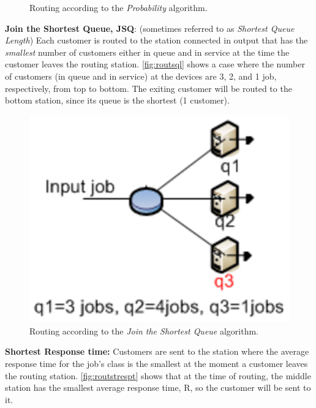 \begin{itemize*}
\begin{figure}[h!]
\begin{center}
    \end{center}
    \caption{Routing according to the \emph{Probability} algorithm.}
    \label{fig:routexe}
\end{figure}
\item \textbf{Join the Shortest Queue, JSQ}: (sometimes referred
to as \emph{Shortest Queue Length}) Each customer is routed to the
station connected in output that has the \emph{smallest} number of
customers either in queue and in service at the time the customer
leaves the routing station. \autoref{fig:routsql} shows a case
where the number of customers (in queue and in service) at the
devices are 3, 2, and 1 job, respectively, from top to bottom. The
exiting customer will be routed to the bottom station, since its
queue is the shortest (1 customer).
\begin{figure}[htb]
    \begin{center}
        \includegraphics[scale=.5]{img/jsimg/8.11.eps}
    \end{center}
    \caption{Routing according to the \emph{Join the Shortest Queue} algorithm.}
    \label{fig:routsql}
\end{figure}
\item \textbf{Shortest Response time:} Customers are sent to the
station where the average response time for the job's class is the
smallest at the moment a customer leaves the routing station.
\autoref{fig:routstrespt} shows that at the time of routing,
the middle station has the smallest average response time, R, so
the customer will be sent to it.
\begin{figure}[htb]

\end{figure}
\end{itemize*}
